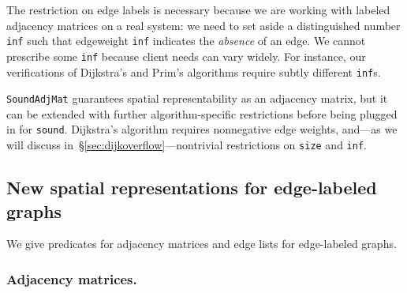 The restriction on edge labels is necessary because we are working
with labeled adjacency matrices on a real system: we need to set aside
a distinguished number \texttt{inf} such that edgeweight \texttt{inf}
indicates the \emph{absence} of an edge. We cannot
prescribe some \texttt{inf} because client needs can vary widely. For
instance, our verifications of Dijkstra's and Prim's algorithms
require subtly different \texttt{inf}s.

\texttt{SoundAdjMat} guarantees spatial representability
as an adjacency matrix, but it can be extended with further
algorithm-specific restrictions before
being plugged in for \texttt{sound}. Dijkstra's algorithm
requires nonnegative edge weights, and---as we will discuss in~\S\ref{sec:dijkoverflow}---nontrivial restrictions on \texttt{size} and \texttt{inf}.

\vspace*{-0.25em}
\subsection{New spatial representations for edge-labeled graphs}
\label{sec:newspatial}
\vspace*{-0.25em}

We give predicates for adjacency matrices and edge lists
for edge-labeled graphs.

\vspace*{-0.5em}
\subsubsection{Adjacency matrices.}

